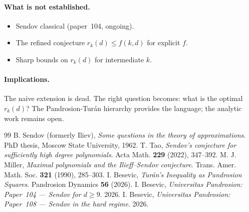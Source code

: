 \documentclass[11pt,a4paper]{article}
\begin{document}
\paragraph{What is not established.}
\begin{itemize}
\item Sendov classical (paper~104, ongoing).
\item The refined conjecture $r_k(d) \le f(k, d)$ for explicit $f$.
\item Sharp bounds on $r_k(d)$ for intermediate $k$.
\end{itemize}

\paragraph{Implications.}
The naive extension is dead. The right question becomes: what is the optimal
$r_k(d)$? The Pandrosion-Turán hierarchy provides the language; the analytic
work remains open.

\begin{thebibliography}{99}
 B. Sendov (formerly Iliev), \textit{Some questions in the theory of approximations}.
PhD thesis, Moscow State University, 1962.
 T. Tao, \textit{Sendov's conjecture for sufficiently high
degree polynomials}. Acta Math. \textbf{229} (2022), 347--392.
 M. J. Miller, \textit{Maximal polynomials and the
Ilieff--Sendov conjecture}. Trans. Amer. Math. Soc. \textbf{321} (1990), 285--303.
 I. Besevic, \textit{Tur\'an's Inequality as Pandrosion Squares}.
Pandrosion Dynamics \textbf{56} (2026).
 I. Besevic, \textit{Universitas Pandrosion: Paper~104 ---
Sendov for $d \ge 9$}. 2026.
 I. Besevic, \textit{Universitas Pandrosion: Paper~108 ---
Sendov in the hard regime}. 2026.
\end{thebibliography}
\end{document}
